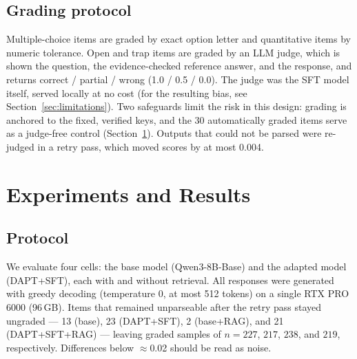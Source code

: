\documentclass[11pt]{article}
\begin{document}
\subsection{Grading protocol}
\label{sec:grading}

Multiple-choice items are graded by exact option letter and
quantitative items by numeric tolerance. Open and trap items are
graded by an LLM judge, which is shown the question, the
evidence-checked reference answer, and the response, and returns
correct / partial / wrong (1.0 / 0.5 / 0.0). The judge was the SFT
model itself, served locally at no cost (for the resulting bias, see
Section~\ref{sec:limitations}). Two safeguards limit the risk in this design:
grading is anchored to the fixed, verified keys, and the 30
automatically graded items serve as a judge-free control
(Section~\ref{sec:experiments}). Outputs that could not be parsed
were re-judged in a retry pass, which moved scores by at most 0.004.

\section{Experiments and Results}
\label{sec:experiments}

\subsection{Protocol}

We evaluate four cells: the base model (Qwen3-8B-Base) and the adapted
model (DAPT+SFT), each with and without retrieval. All responses were
generated with greedy decoding (temperature 0, at most 512 tokens) on
a single RTX PRO 6000 (96\,GB). Items that remained unparseable after
the retry pass stayed ungraded --- 13 (base), 23 (DAPT+SFT), 2
(base+RAG), and 21 (DAPT+SFT+RAG) --- leaving graded samples of $n =
227$, $217$, $238$, and $219$, respectively. Differences below
$\approx$0.02 should be read as noise.
\end{document}
